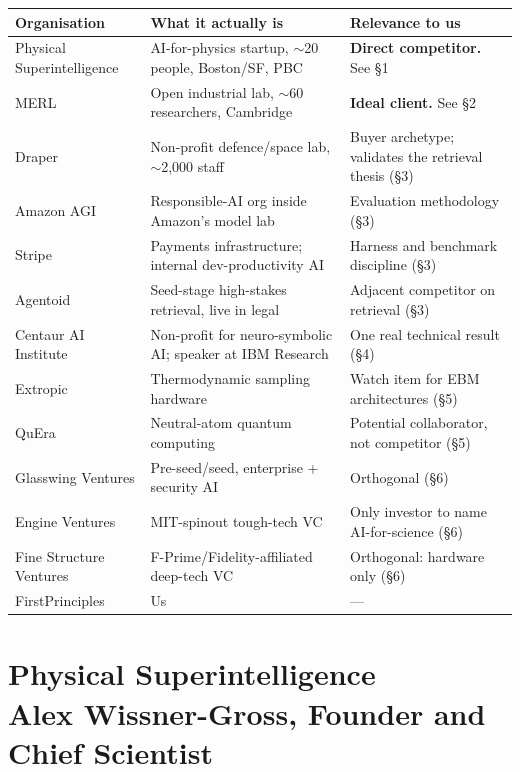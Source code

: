 \documentclass[11pt]{article}
\begin{document}
\begin{table}[t]
\centering
\footnotesize
\begin{tabular}{@{}>{\raggedright\arraybackslash}p{3.5cm}>{\raggedright\arraybackslash}p{5.6cm}>{\raggedright\arraybackslash}p{5.4cm}@{}}
\toprule
\textbf{Organisation} & \textbf{What it actually is} & \textbf{Relevance to us} \\
\midrule
Physical Superintelligence & AI-for-physics startup, $\sim$20 people, Boston/SF, PBC & \textbf{Direct competitor.} See \S1 \\[18pt]
MERL & Open industrial lab, $\sim$60 researchers, Cambridge & \textbf{Ideal client.} See \S2 \\[18pt]
Draper & Non-profit defence/space lab, $\sim$2{,}000 staff & Buyer archetype; validates the retrieval thesis (\S3) \\[18pt]
Amazon AGI & Responsible-AI org inside Amazon's model lab & Evaluation methodology (\S3) \\[18pt]
Stripe & Payments infrastructure; internal dev-productivity AI & Harness and benchmark discipline (\S3) \\[18pt]
Agentoid & Seed-stage high-stakes retrieval, live in legal & Adjacent competitor on retrieval (\S3) \\[18pt]
Centaur AI Institute & Non-profit for neuro-symbolic AI; speaker at IBM Research & One real technical result (\S4) \\[18pt]
Extropic & Thermodynamic sampling hardware & Watch item for EBM architectures (\S5) \\[18pt]
QuEra & Neutral-atom quantum computing & Potential collaborator, not competitor (\S5) \\[18pt]
Glasswing Ventures & Pre-seed/seed, enterprise + security AI & Orthogonal (\S6) \\[18pt]
Engine Ventures & MIT-spinout tough-tech VC & Only investor to name AI-for-science (\S6) \\[18pt]
Fine Structure Ventures & F-Prime/Fidelity-affiliated deep-tech VC & Orthogonal: hardware only (\S6) \\[18pt]
FirstPrinciples & Us & --- \\
\bottomrule
\end{tabular}
\end{table}

\section{Physical Superintelligence\\
{\large Alex Wissner-Gross, Founder and Chief Scientist}}
\end{document}
